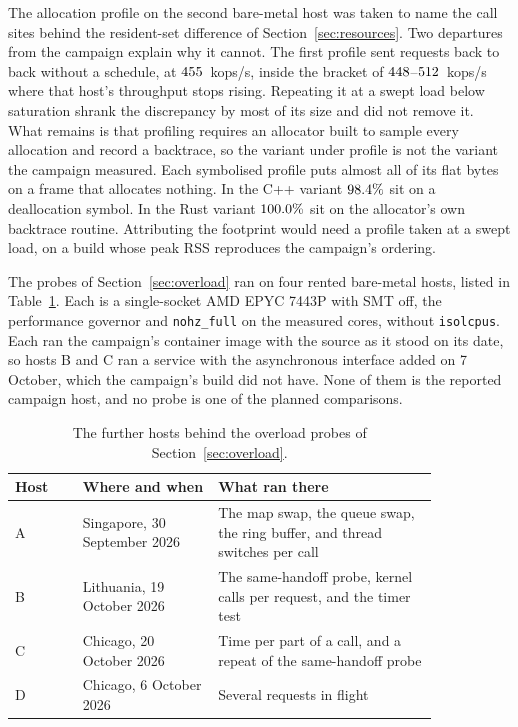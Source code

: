 \documentclass[english,oneside,a4paper,censored,csm,software-track-2020]{HYthesisML}
\begin{document}
\begin{appendices}
The allocation profile on the second bare-metal host was taken to name the call sites behind
the resident-set difference of Section~\ref{sec:resources}. Two departures from the campaign
explain why it cannot. The first profile sent requests back to back without a schedule, at
$455$~kops/s, inside the bracket of $448$--$512$~kops/s where that
host's throughput stops rising. Repeating it at a swept load below saturation
shrank the discrepancy by most of its size and did not remove it. What remains is that
profiling requires an allocator built to sample every allocation and record a backtrace, so the
variant under profile is not the variant the campaign measured. Each symbolised profile puts
almost all of its flat bytes on a frame that allocates nothing. In the C++ variant
$98.4\%$ sit on a deallocation symbol. In the Rust variant
$100.0\%$ sit on the allocator's own backtrace routine. Attributing the footprint
would need a profile taken at a swept load, on a build whose peak RSS reproduces the campaign's
ordering.

The probes of Section~\ref{sec:overload} ran on four rented bare-metal hosts,
listed in Table~\ref{tab:probehosts}. Each is a single-socket AMD EPYC 7443P
with SMT off, the performance governor and \texttt{nohz\_full} on the measured
cores, without \texttt{isolcpus}. Each ran the campaign's container image with the source as
it stood on its date, so hosts B and C ran a service with the asynchronous interface added on
7 October, which the campaign's build did not have.
None of them is the reported campaign host, and no probe is one of the
planned comparisons.

\begin{table}[!ht]
\centering
\small
\caption[The further hosts behind the overload probes]{The further hosts behind
the overload probes of Section~\ref{sec:overload}.\label{tab:probehosts}}
\renewcommand{\arraystretch}{1.2}
\setlength{\tabcolsep}{6pt}
\begin{tabular}{@{}l>{\raggedright\arraybackslash}p{0.32\linewidth}%
>{\raggedright\arraybackslash}p{0.52\linewidth}@{}}
\hline\hline
Host & Where and when & What ran there \\
\hline
A & Singapore, 30 September 2026 & The map swap, the queue swap, the ring
buffer, and thread switches per call \\
B & Lithuania, 19 October 2026 & The same-handoff probe, kernel calls per
request, and the timer test \\
C & Chicago, 20 October 2026 & Time per part of a call, and a repeat of the
same-handoff probe \\
D & Chicago, 6 October 2026 & Several requests in flight \\
\hline
\end{tabular}
\end{table}


\end{appendices}
\end{document}
